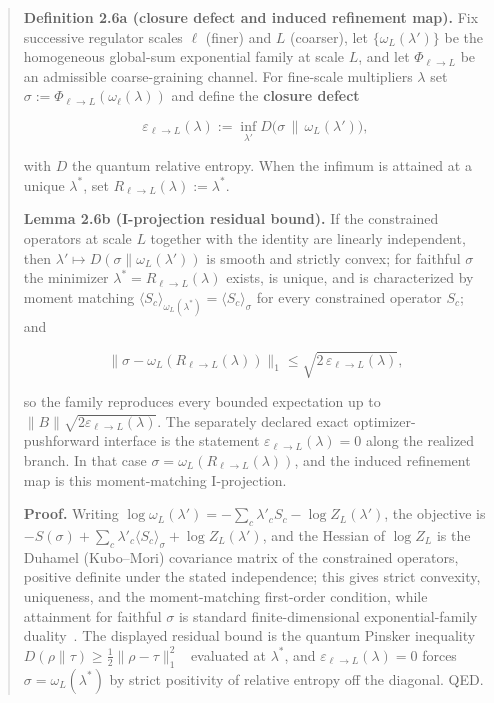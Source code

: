 \begin{quote}
\textbf{Definition 2.6a (closure defect and induced refinement map).} Fix successive regulator scales \(\ell\) (finer) and \(L\) (coarser), let \(\{\omega_L(\lambda')\}\) be the homogeneous global-sum exponential family at scale \(L\), and let \(\Phi_{\ell\to L}\) be an admissible coarse-graining channel. For fine-scale multipliers \(\lambda\) set \(\sigma := \Phi_{\ell\to L}(\omega_\ell(\lambda))\) and define the \textbf{closure defect}

\[
\varepsilon_{\ell\to L}(\lambda) := \inf_{\lambda'} D\bigl(\sigma \,\big\|\, \omega_L(\lambda')\bigr),
\]

with \(D\) the quantum relative entropy. When the infimum is attained at a unique \(\lambda^\ast\), set \(R_{\ell\to L}(\lambda) := \lambda^\ast\).

\textbf{Lemma 2.6b (I-projection residual bound).} If the constrained operators at scale \(L\) together with the identity are linearly independent, then \(\lambda' \mapsto D(\sigma\|\omega_L(\lambda'))\) is smooth and strictly convex; for faithful \(\sigma\) the minimizer \(\lambda^\ast = R_{\ell\to L}(\lambda)\) exists, is unique, and is characterized by moment matching \(\langle S_c\rangle_{\omega_L(\lambda^\ast)} = \langle S_c\rangle_\sigma\) for every constrained operator \(S_c\); and

\[
\bigl\|\sigma - \omega_L(R_{\ell\to L}(\lambda))\bigr\|_1 \le \sqrt{2\,\varepsilon_{\ell\to L}(\lambda)},
\]

so the family reproduces every bounded expectation up to \(\|B\|\sqrt{2\varepsilon_{\ell\to L}(\lambda)}\). The separately declared exact optimizer-pushforward interface is the statement \(\varepsilon_{\ell\to L}(\lambda) = 0\) along the realized branch. In that case \(\sigma = \omega_L(R_{\ell\to L}(\lambda))\), and the induced refinement map is this moment-matching I-projection.

\textbf{Proof.} Writing \(\log\omega_L(\lambda') = -\sum_c \lambda'_c S_c - \log Z_L(\lambda')\), the objective is \(-S(\sigma) + \sum_c \lambda'_c \langle S_c\rangle_\sigma + \log Z_L(\lambda')\), and the Hessian of \(\log Z_L\) is the Duhamel (Kubo--Mori) covariance matrix of the constrained operators, positive definite under the stated independence; this gives strict convexity, uniqueness, and the moment-matching first-order condition, while attainment for faithful \(\sigma\) is standard finite-dimensional exponential-family duality~\cite{wichmann63}. The displayed residual bound is the quantum Pinsker inequality \(D(\rho\|\tau) \ge \tfrac12\|\rho-\tau\|_1^2\)~\cite{hiaiOhyaTsukada81} evaluated at \(\lambda^\ast\), and \(\varepsilon_{\ell\to L}(\lambda) = 0\) forces \(\sigma = \omega_L(\lambda^\ast)\) by strict positivity of relative entropy off the diagonal. QED.


\end{quote}
